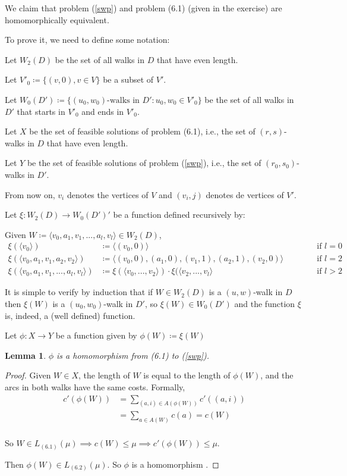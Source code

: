 \documentclass[a4paper,10pt, leqno]{article}
\let\oldref\ref
\renewcommand{\ref}[1]{(\oldref{#1})}
\begin{document}
We claim that problem \ref{swp} and problem (6.1) (given in the exercise) are homomorphically equivalent.

To prove it, we need to define some notation:

Let $W_2(D)$ be the set of all walks in $D$ that have even length.

Let $V'_0 \coloneqq \{(v, 0), v \in V \}$ be a subset of $V'$.

Let $W_0(D') \coloneqq \{ (u_0, w_0)\text{-walks in } D' : u_0, w_0 \in V'_0\}$ be the set of all walks in $D'$ that starts in $V'_0$ and ends in $V'_0$. 

Let $X$ be the set of feasible solutions of problem (6.1), i.e., the set of $(r, s)$-walks in $D$ that have even length.

Let $Y$ be the set of feasible solutions of problem \ref{swp}, i.e., the set of $(r_0, s_0)$-walks in $D'$. 

From now on, $v_i$ denotes the vertices of $V$ and $(v_i, j)$ denotes de vertices of $V'$. 

Let $\xi : W_2(D) \to W_0(D')'$ be a function defined recursively by:

Given $W \coloneqq \langle v_0, a_1, v_1, ..., a_l, v_l\rangle \in W_2(D)$, 
\begin{align*}
\xi(\langle v_0 \rangle) &\coloneqq \langle (v_0, 0) \rangle & & & & & \text{if } l = 0 \\
\xi(\langle v_0, a_1, v_1, a_2, v_2\rangle) &\coloneqq  \langle (v_0, 0), (a_1, 0), (v_1, 1), (a_2, 1), (v_2, 0) \rangle & & & & & \text{if } l = 2 \\
\xi(\langle v_0, a_1, v_1, ..., a_l, v_l\rangle) &\coloneqq \xi(\langle v_0, ..., v_2 \rangle) \cdotp \xi(\langle v_2, ..., v_l\rangle & & & & & \text{if } l > 2
\end{align*}

It is simple to verify by induction that if $W \in W_2(D)$ is a $(u, w)$-walk in $D$ then $\xi(W)$ is a $(u_0, w_0)$-walk in $D'$, so $\xi(W) \in W_0(D')$ and the function $\xi$ is, indeed, a (well defined) function. 

Let $\phi : X \to Y$ be a function given by $\phi(W) \coloneqq \xi(W)$ 

\newtheorem{lemma}{Lemma}
\begin{lemma}
    \label{homo1}
    $\phi$ is a homomorphism from (6.1) to \ref{swp}. 
\end{lemma}
\begin{proof}
    Given $W \in X$, the length of $W$ is equal to the length of $\phi(W)$, and the arcs in both walks have the same costs.
    Formally,
    \begin{align*}c'(\phi(W)) &= \sum_{(a, i) \in A(\phi(W))}{c'((a, i))}  \\
    &= \sum_{a \in A(W)}{c(a)} 
    = c(W) \\
    \end{align*}
    
    So $W \in L_{(6.1)}(\mu) \implies c(W) \leq \mu \implies c'(\phi(W)) \leq \mu$.
    
    Then $\phi(W) \in L_{(6.2)}(\mu)$. So $\phi$ is a homomorphism .
\end{proof}
\end{document}
